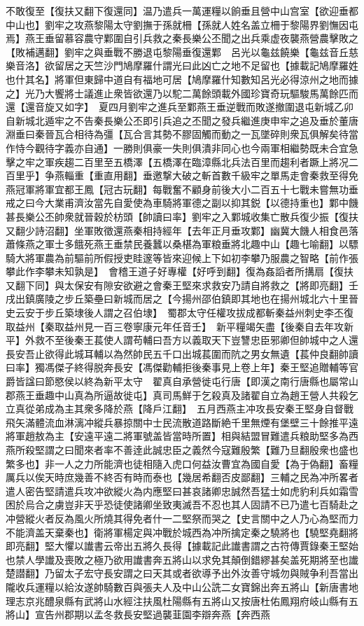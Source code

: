 不敢復至【復扶又翻下復還同】温乃遣兵一萬運糧以餉垂且營中山宫室【欲迎垂都中山也】劉牢之攻燕黎陽太守劉撫于孫就柵【孫就人姓名盖立柵于黎陽界劉憮因屯焉】燕王垂留慕容農守鄴圍自引兵救之秦長樂公丕聞之出兵乘虚夜襲燕營農擊敗之【敗補邁翻】劉牢之與垂戰不勝退屯黎陽垂復還鄴　呂光以龜兹饒樂【龜兹音丘慈樂音洛】欲留居之天竺沙門鳩摩羅什謂光曰此凶亡之地不足留也【據載記鳩摩羅姓也什其名】將軍但東歸中道自有福地可居【鳩摩羅什知數知呂光必得涼州之地而據之】光乃大饗將士議進止衆皆欲還乃以駝二萬餘頭載外國珍寶奇玩驅駿馬萬餘匹而還【還音旋又如字】　夏四月劉牢之進兵至鄴燕王垂逆戰而敗遂撤圍退屯新城乙卯自新城北遁牢之不告秦長樂公丕即引兵追之丕聞之發兵繼進庚申牢之追及垂於董唐淵垂曰秦晉瓦合相待為彊【瓦合言其勢不膠固觸而動之一瓦墜碎則衆瓦俱解矣待當作恃今觀待字義亦自通】一勝則俱豪一失則俱潰非同心也今兩軍相繼勢既未合宜急擊之牢之軍疾趨二百里至五橋澤【五橋澤在臨漳縣北兵法百里而趨利者蹶上將况二百里乎】争燕輜重【重直用翻】垂邀撃大破之斬首數千級牢之單馬走會秦救至得免燕冠軍將軍宜都王鳳【冠古玩翻】每戰奮不顧身前後大小二百五十七戰未嘗無功垂戒之曰今大業甫濟汝當先自愛使為車騎將軍德之副以抑其鋭【以德持重也】鄴中饑甚長樂公丕帥衆就晉穀於枋頭【帥讀曰率】劉牢之入鄴城收集亡散兵復少振【復扶又翻少詩沼翻】坐軍敗徵還燕秦相持經年【去年正月垂攻鄴】幽冀大饑人相食邑落蕭條燕之軍士多餓死燕王垂禁民養蠶以桑椹為軍粮垂將北趣中山【趣七喻翻】以驃騎大將軍農為前驅前所假授吏眭邃等皆來迎候上下如初李攀乃服農之智略【前作張攀此作李攀未知孰是】　會稽王道子好專權【好呼到翻】復為姦謟者所搆扇【復扶又翻下同】與太保安有隙安欲避之會秦王堅來求救安乃請自將救之【將即亮翻】壬戌出鎮廣陵之步丘築壘曰新城而居之【今揚州邵伯鎮即其地也在揚州城北六十里晉史云安于步丘築埭後人謂之召伯埭】　蜀郡太守任權攻拔成都斬秦益州刺史李丕復取益州【秦取益州見一百三卷寧康元年任音壬】　新平糧竭矢盡【後秦自去年攻新平】外救不至後秦王萇使人謂苟輔曰吾方以義取天下豈讐忠臣邪卿但帥城中之人還長安吾止欲得此城耳輔以為然帥民五千口出城萇圍而阬之男女無遺【萇仲良翻帥讀曰率】獨馮傑子終得脱奔長安【馮傑勸輔拒後秦事見上卷上年】秦王堅追贈輔等官爵皆諡曰節愍侯以終為新平太守　翟真自承營徙屯行唐【即漢之南行唐縣也屬常山郡燕王垂趣中山真為所逼故徙屯】真司馬鮮于乞殺真及諸翟自立為趙王營人共殺乞立真從弟成為主其衆多降於燕【降戶江翻】　五月西燕主冲攻長安秦王堅身自督戰飛矢滿體流血淋漓冲縱兵暴掠關中士民流散道路斷絶千里無煙有堡壁三十餘推平遠將軍趙敖為主【安遠平遠二將軍號盖皆當時所置】相與結盟冒難遣兵粮助堅多為西燕所殺堅謂之曰聞來者率不善逹此誠忠臣之義然今寇難殷繁【難乃旦翻殷衆也盛也繁多也】非一人之力所能濟也徒相隨入虎口何益汝曹宜為國自愛【為于偽翻】畜糧厲兵以俟天時庶幾善不終否有時而泰也【幾居希翻否皮鄙翻】三輔之民為冲所畧者遣人密告堅請遣兵攻冲欲縱火為内應堅曰甚哀諸卿忠誠然吾猛士如虎豹利兵如霜雪困於烏合之虜豈非天乎恐徒使諸卿坐致夷滅吾不忍也其人固請不已乃遣七百騎赴之冲營縱火者反為風火所燒其得免者什一二堅祭而哭之【史言關中之人乃心為堅而力不能濟盖天棄秦也】衛將軍楊定與冲戰於城西為冲所擒定秦之驍將也【驍堅堯翻將即亮翻】堅大懼以䜟書云帝出五將久長得【據載記此䜟書謂之古符傳賈錄秦王堅始也禁人學䜟及喪敗之極乃欲用䜟書奔五將山以求免其顛倒錯繆甚矣盖死期將至也䜟楚譛翻】乃留太子宏守長安謂之曰天其或者欲導予出外汝善守城勿與賊争利吾當出隴收兵運糧以給汝遂帥騎數百與張夫人及中山公詵二女寶錦出奔五將山【新唐書地理志京兆醴泉縣有武將山水經注扶風杜陽縣有五將山又按唐杜佑鳳翔府岐山縣有五將山】宣告州郡期以孟冬救長安堅過襲韮園李辯奔燕【奔西燕